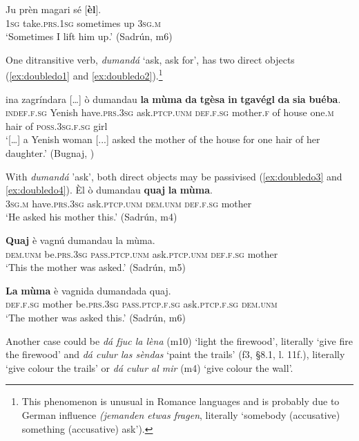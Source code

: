 \ea
\label{ex:do4}
\gll  Ju prèn magari sé [\textbf{èl}].\\
\textsc{1sg} take.\textsc{prs.1sg} sometimes up \textsc{3sg.m}\\
\glt `Sometimes I lift him up.' (Sadrún, m6)
\z

One ditransitive verb, \textit{dumandá} `ask, ask for', has two direct objects (\ref{ex:doubledo1} and \ref{ex:doubledo2}).\footnote{This phenomenon is unusual in Romance languages and is probably due to German influence \textit{(jemanden etwas fragen}, literally `somebody (accusative) something (accusative) ask').}

\ea
\label{ex:doubledo1}
\gll  [...]  ina zagríndara […] ò dumandau {\ob}\textbf{la} \textbf{mùma} \textbf{da} \textbf{tgèsa}{\cb} {\ob}\textbf{in} \textbf{tgavégl} \textbf{da} \textbf{sia} \textbf{buéba}{\cb}. \\
{} \textsc{indef.f.sg} Yenish {} have.\textsc{prs.3sg}   ask.\textsc{ptcp.unm} \textsc{def.f.sg} mother.\textsc{f} of house one.\textsc{m} hair of \textsc{poss.3sg.f.sg} girl \\
\glt `[…] a Yenish woman [...] asked the mother of the house for one hair of her daughter.' (Bugnaj, \citealt[131]{Büchli1966})
\z

With \textit{dumandá} 'ask', both direct objects may be passivised (\ref{ex:doubledo3} and \ref{ex:doubledo4}).
\ea
\label{ex:doubledo2}
\gll Èl ò dumandau {\ob}{\textbf{quaj}}{\cb} {\ob}{\textbf{la}} {\textbf{mùma}}{\cb}.\\
\textsc{3sg.m}  have\textsc{.prs.3sg} ask.\textsc{ptcp.unm} \textsc{dem.unm} \textsc{def.f.sg} mother\\
\glt `He asked his mother this.' (Sadrún, m4)
\z

\ea
\label{ex:doubledo3}
\gll {\ob}\textbf{Quaj}{\cb} è vagnú dumandau la mùma.\\
 \textsc{dem.unm} be.\textsc{prs.3sg} \textsc{ pass.ptcp.unm} ask.\textsc{ptcp.unm} \textsc{def.f.sg} mother\\
\glt `This the mother was asked.' (Sadrún, m5)
\z

\ea
\label{ex:doubledo4}
\gll {\ob}\textbf{La} \textbf{mùma}{\cb} è vagnida dumandada quaj. \\
\textsc{def.f.sg} mother be.\textsc{prs.3sg} \textsc{pass.ptcp.f.sg} ask.\textsc{ptcp.f.sg} \textsc{dem.unm}\\
\glt `The mother was asked this.' (Sadrún, m6)
\z


Another case could be \textit{dá fjuc la lèna} (m10) `light the firewood', literally `give fire the firewood'  and \textit{dá culur las sèndas} `paint  the trails' (f3, §8.1, l. 11f.), literally `give colour the trails' or \textit{dá culur al mir} (m4) `give colour the wall'.


